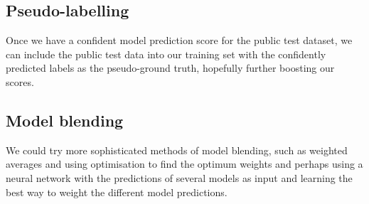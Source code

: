 \documentclass{article}
\begin{document}
\subsection{Pseudo-labelling}
Once we have a confident model prediction score for the public test dataset, we can include the public test data into our training set with the confidently predicted labels as the pseudo-ground truth, hopefully further boosting our scores.

\subsection{Model blending}
We could try more sophisticated methods of model blending, such as weighted averages and using optimisation to find the optimum weights and perhaps using a neural network with the predictions of several models as input and learning the best way to weight the different model predictions.

\end{document}
